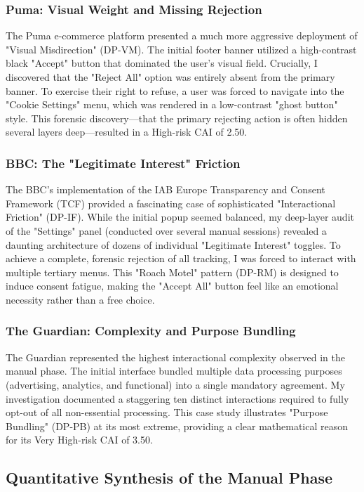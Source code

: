 \documentclass[12pt,a4paper]{report}
\begin{document}
\subsubsection{Puma: Visual Weight and Missing Rejection}
The Puma e-commerce platform presented a much more aggressive deployment of "Visual Misdirection" (DP-VM). The initial footer banner utilized a high-contrast black "Accept" button that dominated the user's visual field. Crucially, I discovered that the "Reject All" option was entirely absent from the primary banner. To exercise their right to refuse, a user was forced to navigate into the "Cookie Settings" menu, which was rendered in a low-contrast "ghost button" style. This forensic discovery—that the primary rejecting action is often hidden several layers deep—resulted in a High-risk CAI of 2.50.

\subsubsection{BBC: The "Legitimate Interest" Friction}
The BBC's implementation of the IAB Europe Transparency and Consent Framework (TCF) provided a fascinating case of sophisticated "Interactional Friction" (DP-IF). While the initial popup seemed balanced, my deep-layer audit of the "Settings" panel (conducted over several manual sessions) revealed a daunting architecture of dozens of individual "Legitimate Interest" toggles. To achieve a complete, forensic rejection of all tracking, I was forced to interact with multiple tertiary menus. This "Roach Motel" pattern (DP-RM) is designed to induce consent fatigue, making the "Accept All" button feel like an emotional necessity rather than a free choice.

\subsubsection{The Guardian: Complexity and Purpose Bundling}
The Guardian represented the highest interactional complexity observed in the manual phase. The initial interface bundled multiple data processing purposes (advertising, analytics, and functional) into a single mandatory agreement. My investigation documented a staggering ten distinct interactions required to fully opt-out of all non-essential processing. This case study illustrates "Purpose Bundling" (DP-PB) at its most extreme, providing a clear mathematical reason for its Very High-risk CAI of 3.50.

\subsection{Quantitative Synthesis of the Manual Phase}
\end{document}
